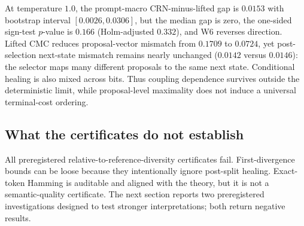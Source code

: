 At temperature $1.0$, the prompt-macro CRN-minus-lifted gap is $0.0153$ with bootstrap interval $[0.0026,0.0306]$, but the median gap is zero, the one-sided sign-test $p$-value is $0.166$ (Holm-adjusted $0.332$), and W6 reverses direction. Lifted CMC reduces proposal-vector mismatch from $0.1709$ to $0.0724$, yet post-selection next-state mismatch remains nearly unchanged ($0.0142$ versus $0.0146$): the selector maps many different proposals to the same next state. Conditional healing is also mixed across bits. Thus coupling dependence survives outside the deterministic limit, while proposal-level maximality does not induce a universal terminal-cost ordering.

\subsection{What the certificates do not establish}
All preregistered relative-to-reference-diversity certificates fail. First-divergence bounds can be loose because they intentionally ignore post-split healing. Exact-token Hamming is auditable and aligned with the theory, but it is not a semantic-quality certificate. The next section reports two preregistered investigations designed to test stronger interpretations; both return negative results.

